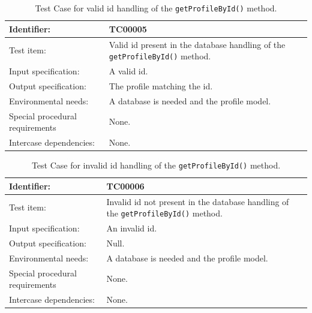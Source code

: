 \begin{table}[htbp]
	\centering
		\begin{tabular}{| p{4.5cm} | m{9cm} |}
			\hline
			Identifier: 					& TC00005 \\ \hline
			Test item:						& Valid id present in the database handling of the \texttt{getProfileById()} method. \\ \hline
			Input specification:			& A valid id. \\ \hline
			Output specification: 			& The profile matching the id. \\ \hline
			Environmental needs:			& A database is needed and the profile model. \\ \hline
			Special procedural requirements	& None. \\ \hline
			Intercase dependencies:			& None. \\ \hline
		\end{tabular}
	\caption{Test Case for valid id handling of the \texttt{getProfileById()} method.}
	\label{tab:TestCase_ValidIdHandling}
\end{table}

\begin{table}[htbp]
	\centering
		\begin{tabular}{| p{4.5cm} | m{9cm} |}
			\hline
			Identifier: 					& TC00006 \\ \hline
			Test item:						& Invalid id not present in the database handling of the \texttt{getProfileById()} method. \\ \hline
			Input specification:			& An invalid id. \\ \hline
			Output specification: 			& Null. \\ \hline
			Environmental needs:			& A database is needed and the profile model. \\ \hline
			Special procedural requirements	& None. \\ \hline
			Intercase dependencies:			& None. \\ \hline
		\end{tabular}
	\caption{Test Case for invalid id handling of the \texttt{getProfileById()} method.}
	\label{tab:TestCase_InvalidIdHandling}
\end{table}

